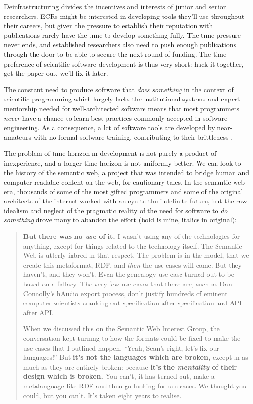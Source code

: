 Deinfrastructuring divides the incentives and interests of junior and
senior researchers. ECRs might be interested in developing tools they'll
use throughout their careers, but given the pressure to establish their
reputation with publications rarely have the time to develop something
fully. The time pressure never ends, and established researchers also
need to push enough publications through the door to be able to secure
the next round of funding. The time preference of scientific software
development is thus very short: hack it together, get the paper out,
we'll fix it later.

The constant need to produce software that \emph{does something} in the
context of scientific programming which largely lacks the institutional
systems and expert mentorship needed for well-architected software means
that most programmers \emph{never} have a chance to learn best practices
commonly accepted in software engineering. As a consequence, a lot of
software tools are developed by near-amateurs with no formal software
training, contributing to their brittleness \citep{altschulAnatomySuccessfulComputational2013} .

The problem of time horizon in development is not purely a product of
inexperience, and a longer time horizon is not uniformly better. We can
look to the history of the semantic web, a project that was intended to
bridge human and computer-readable content on the web, for cautionary
tales. In the semantic web era, thousands of some of the most gifted
programmers and some of the original architects of the internet worked
with an eye to the indefinite future, but the raw idealism and neglect
of the pragmatic reality of the need for software to \emph{do something}
drove many to abandon the effort (bold is mine, italics in original):

\begin{quote}
\textbf{But there was no \emph{use} of it.} I wasn't using any of the
technologies for anything, except for things related to the technology
itself. The Semantic Web is utterly inbred in that respect. The problem
is in the model, that we create this metaformat, RDF, and \emph{then}
the use cases will come. But they haven't, and they won't. Even the
genealogy use case turned out to be based on a fallacy. The very few use
cases that there are, such as Dan Connolly's hAudio export process,
don't justify hundreds of eminent computer scientists cranking out
specification after specification and API after API.

When we discussed this on the Semantic Web Interest Group, the
conversation kept turning to how the formats could be fixed to make the
use cases that I outlined happen. ``Yeah, Sean's right, let's fix our
languages!'' But \textbf{it's not the languages which are broken,}
except in as much as they are entirely broken: because \textbf{it's the
\emph{mentality} of their design which is broken.} You can't, it has
turned out, make a metalanguage like RDF and then go looking for use
cases. We thought you could, but you can't. It's taken eight years to
realise. \citep{palmerDitchingSemanticWeb2008} 
\end{quote}

